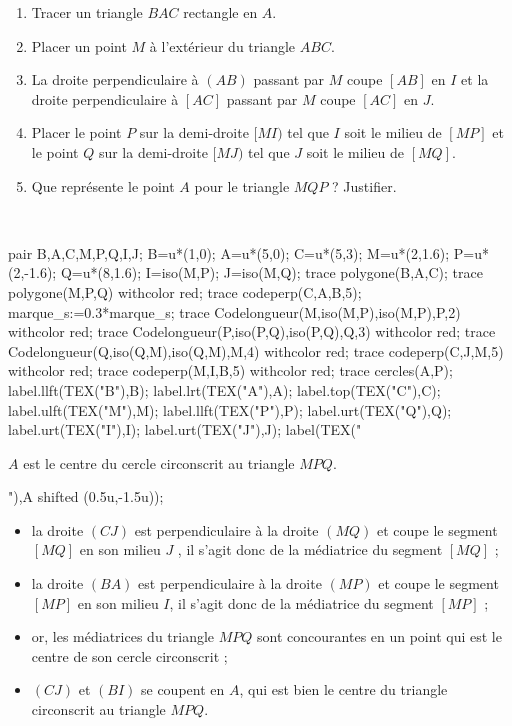 \begin{exercice*}
   \begin{enumerate}
      \item Tracer un triangle $BAC$ rectangle en $A$.
      \item Placer un point $M$ à l'extérieur du triangle $ABC$.
      \item La droite perpendiculaire à $(AB)$ passant par $M$ coupe $[AB]$ en $I$ et la droite perpendiculaire à $[AC]$ passant par $M$ coupe $[AC]$ en $J$.
      \item Placer le point $P$ sur la demi-droite $[MI)$ tel que $I$ soit le milieu de $[MP]$ et le point $Q$ sur la demi-droite $[MJ)$ tel que $J$ soit le milieu de $[MQ]$.
      \item Que représente le point $A$ pour le triangle $MQP$ ? Justifier.
   \end{enumerate}
\end{exercice*}

\begin{corrige}
   \ \\ [-5mm]
   \begin{Geometrie}[CoinBG={(0,-3.5u)}]
      pair B,A,C,M,P,Q,I,J;
      B=u*(1,0);
      A=u*(5,0);
      C=u*(5,3);
      M=u*(2,1.6);
      P=u*(2,-1.6);
      Q=u*(8,1.6);
      I=iso(M,P);
      J=iso(M,Q);
      trace polygone(B,A,C);
      trace polygone(M,P,Q) withcolor red;
      trace codeperp(C,A,B,5);
      marque_s:=0.3*marque_s;
      trace Codelongueur(M,iso(M,P),iso(M,P),P,2) withcolor red;
      trace Codelongueur(P,iso(P,Q),iso(P,Q),Q,3) withcolor red;
      trace Codelongueur(Q,iso(Q,M),iso(Q,M),M,4) withcolor red;
      trace codeperp(C,J,M,5) withcolor red;
      trace codeperp(M,I,B,5) withcolor red;
      trace cercles(A,P);
      label.llft(TEX("B"),B);
      label.lrt(TEX("A"),A);
      label.top(TEX("C"),C);
      label.ulft(TEX("M"),M);
      label.llft(TEX("P"),P);
      label.urt(TEX("Q"),Q);
      label.urt(TEX("I"),I);
      label.urt(TEX("J"),J);
      label(TEX("\parbox{4cm}{$A$ est le {\red centre du cercle circonscrit au triangle $MPQ$}.}"),A shifted (0.5u,-1.5u));
   \end{Geometrie}

   \begin{itemize}
      \item la droite $(CJ)$ est perpendiculaire à la droite $(MQ)$ et coupe le segment $[MQ]$ en son milieu $J$ , il s'agit donc de la médiatrice du segment $[MQ]$ ;
      \item la droite $(BA)$ est perpendiculaire à la droite $(MP)$ et coupe le segment $[MP]$ en son milieu $I$, il s'agit donc de la médiatrice du segment $[MP]$ ;
      \item or, les médiatrices du triangle $MPQ$ sont concourantes en un point qui est le centre de son cercle circonscrit ;
      \item $(CJ)$ et $(BI)$ se coupent en $A$, qui est bien le centre du triangle circonscrit au triangle $MPQ$.
   \end{itemize}
\end{corrige}
